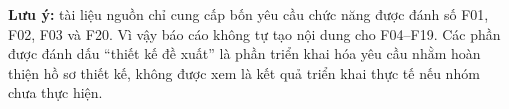 \documentclass[12pt,a4paper,oneside]{report}
\begin{document}
\textbf{Lưu ý:} tài liệu nguồn chỉ cung cấp bốn yêu cầu chức năng được đánh số F01, F02, F03 và F20. Vì vậy báo cáo không tự tạo nội dung cho F04--F19. Các phần được đánh dấu ``thiết kế đề xuất'' là phần triển khai hóa yêu cầu nhằm hoàn thiện hồ sơ thiết kế, không được xem là kết quả triển khai thực tế nếu nhóm chưa thực hiện.

\tableofcontents
\listoffigures
\listoftables

\clearpage
{}











\appendix






\end{document}
